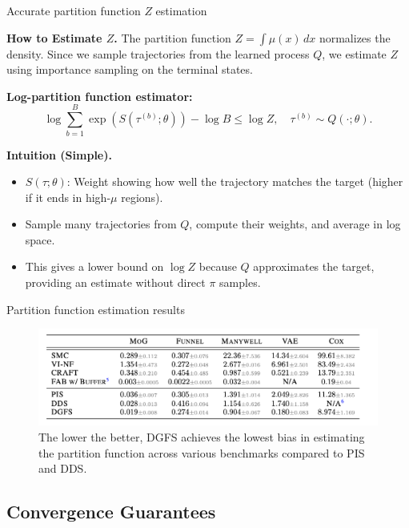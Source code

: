 \documentclass[aspectratio=169,xcolor=dvipsnames]{beamer}
\begin{document}
\begin{frame}[t]{Accurate partition function $Z$ estimation}
\footnotesize

\textbf{How to Estimate $Z$.} The partition function $Z = \int \mu(x) \, dx$ normalizes the density. Since we sample trajectories from the learned process $Q$, we estimate $Z$ using importance sampling on the terminal states.

\textbf{Log-partition function estimator:}
\[
\log \sum_{b=1}^B \exp(S(\tau^{(b)}; \theta)) - \log B \leq \log Z, \quad \tau^{(b)} \sim Q(\cdot; \theta).
\]

\textbf{Intuition (Simple).}
\begin{itemize}\itemsep2pt
  \item $S(\tau; \theta)$: Weight showing how well the trajectory matches the target (higher if it ends in high-$\mu$ regions).
  \item Sample many trajectories from $Q$, compute their weights, and average in log space.
  \item This gives a lower bound on $\log Z$ because $Q$ approximates the target, providing an estimate without direct $\pi$ samples.
\end{itemize}

\end{frame}

\begin{frame}[t]{Partition function estimation results}
\footnotesize

\begin{figure}
    \centering
    \includegraphics[width=1.025\textwidth]{figures/partition_fnct.png}
    \caption{The lower the better, DGFS achieves the lowest bias in estimating the partition function across various benchmarks compared to PIS and DDS.}
\end{figure}

\end{frame}



\subsection{Convergence Guarantees}
\end{document}
